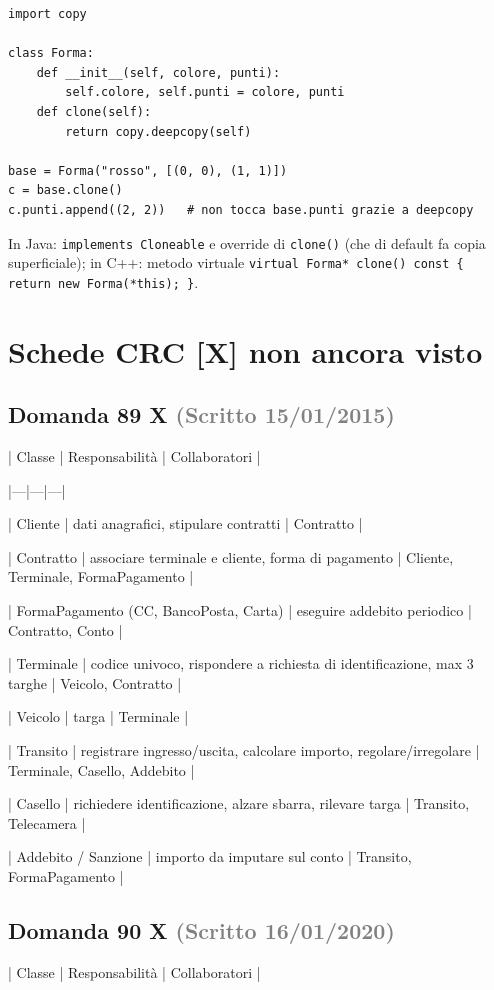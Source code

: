 \documentclass[a4paper,11pt]{article}
\begin{document}
\begin{verbatim}
import copy

class Forma:
    def __init__(self, colore, punti):
        self.colore, self.punti = colore, punti
    def clone(self):
        return copy.deepcopy(self)

base = Forma("rosso", [(0, 0), (1, 1)])
c = base.clone()
c.punti.append((2, 2))   # non tocca base.punti grazie a deepcopy
\end{verbatim}
In Java: \texttt{implements Cloneable} e override di \texttt{clone()} (che di default fa copia superficiale); in C++: metodo virtuale \texttt{virtual Forma* clone() const \{ return new Forma(*this); \}}.



\section{Schede CRC [X] non ancora visto}

\subsection*{Domanda 89 X \hfill {\small \textcolor{gray}{(Scritto 15/01/2015)}}}
| Classe | Responsabilità | Collaboratori |

|---|---|---|

| Cliente | dati anagrafici, stipulare contratti | Contratto |

| Contratto | associare terminale e cliente, forma di pagamento | Cliente, Terminale, FormaPagamento |

| FormaPagamento (CC, BancoPosta, Carta) | eseguire addebito periodico | Contratto, Conto |

| Terminale | codice univoco, rispondere a richiesta di identificazione, max 3 targhe | Veicolo, Contratto |

| Veicolo | targa | Terminale |

| Transito | registrare ingresso/uscita, calcolare importo, regolare/irregolare | Terminale, Casello, Addebito |

| Casello | richiedere identificazione, alzare sbarra, rilevare targa | Transito, Telecamera |

| Addebito / Sanzione | importo da imputare sul conto | Transito, FormaPagamento |



\subsection*{Domanda 90 X \hfill {\small \textcolor{gray}{(Scritto 16/01/2020)}}}
| Classe | Responsabilità | Collaboratori |
\end{document}
